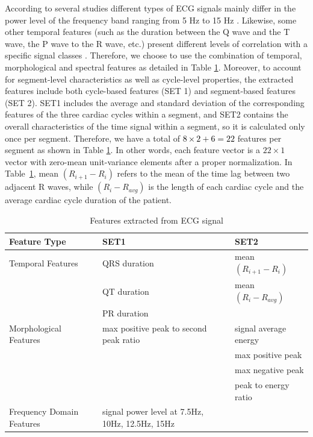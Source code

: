 According to several studies different types of ECG signals mainly differ in the power level of the frequency band ranging from 5 Hz to 15 Hz \cite{martinez2004wavelet}. Likewise, some other temporal features (such as the duration between the Q wave and the T wave, the P wave to the R wave, etc.) present different levels of correlation with a specific signal classes \cite{autofs}. Therefore, we choose to use the combination of temporal, morphological and spectral features as detailed in Table \ref{table:features}. Moreover, to account for segment-level characteristics as well as cycle-level properties, the extracted features include both cycle-based features (SET 1) and segment-based features (SET 2). SET1 includes the average and standard deviation of the corresponding features of the three cardiac cycles within a segment, and SET2 contains the overall characteristics of the time signal within a segment, so it is calculated only once per segment. Therefore, we have a total of \textcolor{black}{$8 \times 2 + 6 =22$} features per segment as shown in Table \ref{table:features}. In other words, each feature vector is a $22×1$ vector with zero-mean unit-variance elements after a proper normalization. %
In Table~\ref{table:features}, mean $(R_{i+1}-R_i)$ refers to the mean of the time lag between two adjacent R waves, while $(R_i-R_{avg})$ is the length of each cardiac cycle and the average cardiac cycle duration of the patient. 

\begin{table}[t]
	\caption{Features extracted from ECG signal}%
	\label{table:features}
	\centering
	\begin{tabular}{|m{10.5em} | m{11em} |m{11em}|}
		\hline 
		Feature Type & SET1 & SET2 \\ 
		\hline 
		Temporal Features & 
		\tabitem QRS duration & \tabitem  mean$(R_{i+1}-R_i)$ \\
		&\tabitem QT duration &\tabitem mean$(R_i-R_{avg})$ \\
		&\tabitem PR duration & \\
		\hline 
		Morphological Features & \tabitem max positive peak to second peak ratio & \tabitem signal average energy\\
		 & & \tabitem max positive peak \\ 
		 & & \tabitem max negative peak \\ 
		 & & \tabitem peak to energy ratio \\ 
		\hline 
		Frequency Domain Features & \tabitem signal power level at 7.5Hz, 10Hz, 12.5Hz, 15Hz &  \\ 
		\hline 
	\end{tabular} 
\end{table}


